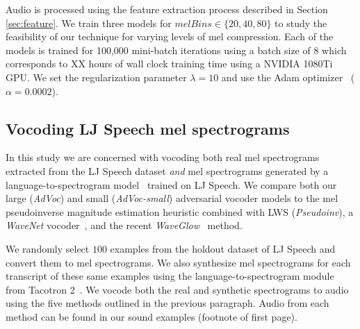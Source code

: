 \documentclass[a4paper]{article}
\begin{document}
Audio is processed using the feature extraction process described in Section \ref{sec:feature}. 
We train three models for $\mathit{melBins} \in \lbrace 20, 40, 80 \rbrace$ to study the feasibility of our technique 
for 
varying
levels of mel compression. Each of the models is trained for 100,000 mini-batch iterations using a batch size of 8 which corresponds to
XX hours of wall clock training time using a NVIDIA 1080Ti GPU. We set the regularization parameter $\lambda = 10$ and use the Adam optimizer~\cite{kingma2014adam} ($\alpha = 0.0002$).

\subsection{Vocoding LJ Speech mel spectrograms}
\label{sec:ljspeechexp}
In this study we are concerned with vocoding both real mel spectrograms extracted from the LJ Speech dataset
\emph{and} mel spectrograms generated by a language-to-spectrogram model~\cite{shen2018natural} trained on LJ Speech. 
We compare both our large (\emph{AdVoc}) and small (\emph{AdVoc-small}) adversarial vocoder models to 
the mel pseudoinverse magnitude estimation heuristic combined with LWS (\emph{Pseudoinv}),
a \emph{WaveNet} vocoder~\cite{shen2018natural}, 
and the recent \emph{WaveGlow}~\cite{waveglow} method.

We randomly select $100$ examples from the holdout dataset of LJ Speech and convert them to mel spectrograms. 
We also synthesize mel spectrograms for each transcript of these same examples using the language-to-spectrogram module from Tacotron 2~\cite{shen2018natural}.
We vocode both the real and synthetic spectrograms to audio using the five methods outlined in the previous paragraph. 
Audio from each method can be found in our sound examples (footnote of first page).
\end{document}
